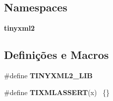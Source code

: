 \subsection*{Namespaces}
\begin{DoxyCompactItemize}
\item 
 {\bf tinyxml2}
\end{DoxyCompactItemize}
\subsection*{Definições e Macros}
\begin{DoxyCompactItemize}
\item 
\#define {\bf T\+I\+N\+Y\+X\+M\+L2\+\_\+\+L\+IB}
\item 
\#define {\bf T\+I\+X\+M\+L\+A\+S\+S\+E\+RT}(x)                  ~\{\}
\end{DoxyCompactItemize}
